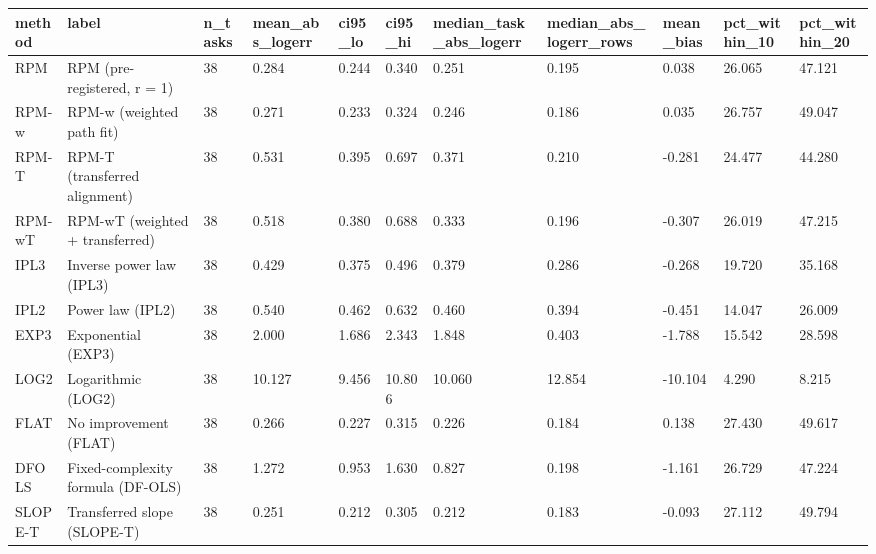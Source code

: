 \begin{tabular}{lllllllllll}
\hline
method & label & n\_tasks & mean\_abs\_logerr & ci95\_lo & ci95\_hi & median\_task\_abs\_logerr & median\_abs\_logerr\_rows & mean\_bias & pct\_within\_10 & pct\_within\_20 \\
\hline
RPM & RPM (pre-registered, r = 1) & 38 & 0.284 & 0.244 & 0.340 & 0.251 & 0.195 & 0.038 & 26.065 & 47.121 \\
RPM-w & RPM-w (weighted path fit) & 38 & 0.271 & 0.233 & 0.324 & 0.246 & 0.186 & 0.035 & 26.757 & 49.047 \\
RPM-T & RPM-T (transferred alignment) & 38 & 0.531 & 0.395 & 0.697 & 0.371 & 0.210 & -0.281 & 24.477 & 44.280 \\
RPM-wT & RPM-wT (weighted + transferred) & 38 & 0.518 & 0.380 & 0.688 & 0.333 & 0.196 & -0.307 & 26.019 & 47.215 \\
IPL3 & Inverse power law (IPL3) & 38 & 0.429 & 0.375 & 0.496 & 0.379 & 0.286 & -0.268 & 19.720 & 35.168 \\
IPL2 & Power law (IPL2) & 38 & 0.540 & 0.462 & 0.632 & 0.460 & 0.394 & -0.451 & 14.047 & 26.009 \\
EXP3 & Exponential (EXP3) & 38 & 2.000 & 1.686 & 2.343 & 1.848 & 0.403 & -1.788 & 15.542 & 28.598 \\
LOG2 & Logarithmic (LOG2) & 38 & 10.127 & 9.456 & 10.806 & 10.060 & 12.854 & -10.104 & 4.290 & 8.215 \\
FLAT & No improvement (FLAT) & 38 & 0.266 & 0.227 & 0.315 & 0.226 & 0.184 & 0.138 & 27.430 & 49.617 \\
DFOLS & Fixed-complexity formula (DF-OLS) & 38 & 1.272 & 0.953 & 1.630 & 0.827 & 0.198 & -1.161 & 26.729 & 47.224 \\
SLOPE-T & Transferred slope (SLOPE-T) & 38 & 0.251 & 0.212 & 0.305 & 0.212 & 0.183 & -0.093 & 27.112 & 49.794 \\
\hline
\end{tabular}
